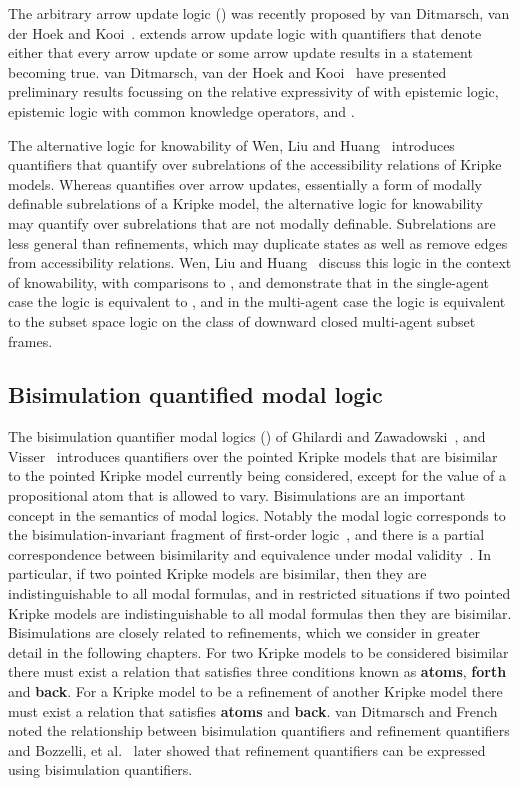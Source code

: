 The arbitrary arrow update logic (\logicAaul{}) was recently proposed by van Ditmarsch, van der Hoek and Kooi~\cite{vanditmarsch:2014}.
\logicAaul{} extends arrow update logic with quantifiers that denote either that every arrow update or some arrow update results in a statement becoming true. 
van Ditmarsch, van der Hoek and Kooi~\cite{vanditmarsch:2014} have presented preliminary results focussing on the relative expressivity of \logicAaul{} with epistemic logic, epistemic logic with common knowledge operators, and \logicApal{}.

The alternative logic for knowability of Wen, Liu and Huang~\cite{wen:2011} introduces quantifiers that quantify over subrelations of the accessibility relations of Kripke models.
Whereas \logicAaul{} quantifies over arrow updates, essentially a form of modally definable subrelations of a Kripke model, the alternative logic for knowability may quantify over subrelations that are not modally definable.
Subrelations are less general than refinements, which may duplicate states as well as remove edges from accessibility relations.
Wen, Liu and Huang~\cite{wen:2011} discuss this logic in the context of knowability, with comparisons to \logicApal{}, and demonstrate that in the single-agent case the logic is equivalent to \logicApal{}, and in the multi-agent case the logic is equivalent to the subset space logic on the class of downward closed multi-agent subset frames.


\subsection{Bisimulation quantified modal logic}

The bisimulation quantifier modal logics (\logicBqml{}) of Ghilardi and Zawadowski~\cite{ghilardi:2002}, and Visser~\cite{visser:1996} introduces quantifiers over the pointed Kripke models that are bisimilar to the pointed Kripke model currently being considered, except for the value of a propositional atom that is allowed to vary.
Bisimulations are an important concept in the semantics of modal logics.
Notably the modal logic \logicK{} corresponds to the bisimulation-invariant fragment of first-order logic~\cite{vanbenthem:1984}, and there is a partial correspondence between bisimilarity and equivalence under modal validity~\cite{goranko:2006}.
In particular, if two pointed Kripke models are bisimilar, then they are indistinguishable to all modal formulas, and in restricted situations if two pointed Kripke models are indistinguishable to all modal formulas then they are bisimilar.
Bisimulations are closely related to refinements, which we consider in greater detail in the following chapters.
For two Kripke models to be considered bisimilar there must exist a relation that satisfies three conditions known as {\bf atoms}, {\bf forth} and {\bf back}.
For a Kripke model to be a refinement of another Kripke model there must exist a relation that satisfies {\bf atoms} and {\bf back}.
van Ditmarsch and French~\cite{vanditmarsch:2009} noted the relationship between bisimulation quantifiers and refinement quantifiers and Bozzelli, et al.~\cite{bozzelli:2014b} later showed that refinement quantifiers can be expressed using bisimulation quantifiers.


